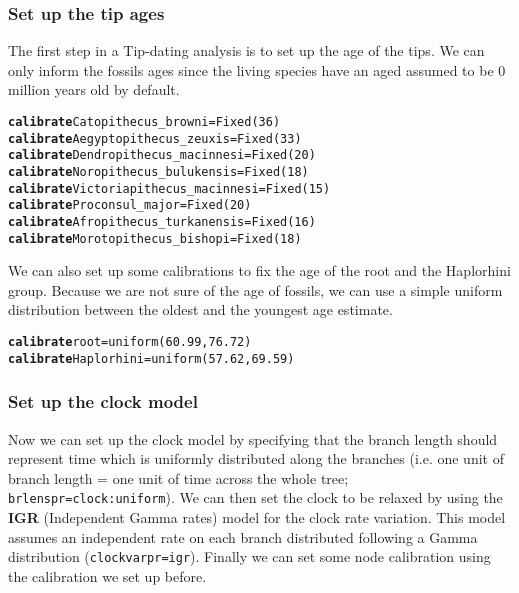 \documentclass{article}\usepackage[]{graphicx}\usepackage[]{color}
\makeatletter
\newcommand{\hlstr}[1]{\textcolor[rgb]{0.192,0.494,0.8}{#1}}%
\newcommand{\hlkwd}[1]{\textcolor[rgb]{0.737,0.353,0.396}{\textbf{#1}}}%
\newenvironment{kframe}{%
 \def\at@end@of@kframe{}%
 \ifinner\ifhmode%
  \def\at@end@of@kframe{\end{minipage}}%
  \begin{minipage}{\columnwidth}%
 \fi\fi%
 \def\FrameCommand##1{\hskip\@totalleftmargin \hskip-\fboxsep
 \colorbox{shadecolor}{##1}\hskip-\fboxsep
     \hskip-\linewidth \hskip-\@totalleftmargin \hskip\columnwidth}%
 \MakeFramed {\advance\hsize-\width
   \@totalleftmargin\z@ \linewidth\hsize
   \@setminipage}}%
 {\par\unskip\endMakeFramed%
 \at@end@of@kframe}
\newenvironment{knitrout}{}{} %
\makeatother
\begin{document}
\subsubsection{Set up the tip ages}
The first step in a Tip-dating analysis is to set up the age of the tips.
We can only inform the fossils ages since the living species have an aged assumed to be 0 million years old by default.
\begin{knitrout}
\color{fgcolor}\begin{kframe}
\begin{alltt}
\hlkwd{calibrate} \hlstr{Catopithecus_browni}=\hlstr{Fixed(36)}
\hlkwd{calibrate} \hlstr{Aegyptopithecus_zeuxis}=\hlstr{Fixed(33)}
\hlkwd{calibrate} \hlstr{Dendropithecus_macinnesi}=\hlstr{Fixed(20)}
\hlkwd{calibrate} \hlstr{Noropithecus_bulukensis}=\hlstr{Fixed(18)}
\hlkwd{calibrate} \hlstr{Victoriapithecus_macinnesi}=\hlstr{Fixed(15)}
\hlkwd{calibrate} \hlstr{Proconsul_major}=\hlstr{Fixed(20)}
\hlkwd{calibrate} \hlstr{Afropithecus_turkanensis}=\hlstr{Fixed(16)}
\hlkwd{calibrate} \hlstr{Morotopithecus_bishopi}=\hlstr{Fixed(18)}
\end{alltt}
\end{kframe}
\end{knitrout}

\noindent We can also set up some calibrations to fix the age of the root and the Haplorhini group.
Because we are not sure of the age of fossils, we can use a simple uniform distribution between the oldest and the youngest age estimate.
\begin{knitrout}
\color{fgcolor}\begin{kframe}
\begin{alltt}
\hlkwd{calibrate} \hlstr{root}=\hlstr{uniform(60.99,76.72)}
\hlkwd{calibrate} \hlstr{Haplorhini}=\hlstr{uniform(57.62,69.59)}
\end{alltt}
\end{kframe}
\end{knitrout}

\subsubsection{Set up the clock model}
Now we can set up the clock model by specifying that the branch length should represent time which is uniformly distributed along the branches (i.e. one unit of branch length = one unit of time across the whole tree; \texttt{brlenspr=clock:uniform}).
We can then set the clock to be relaxed by using the \textbf{IGR} (Independent Gamma rates) model for the clock rate variation.
This model assumes an independent rate on each branch distributed following a Gamma distribution (\texttt{clockvarpr=igr}).
Finally we can set some node calibration using the calibration we set up before.
\end{document}
